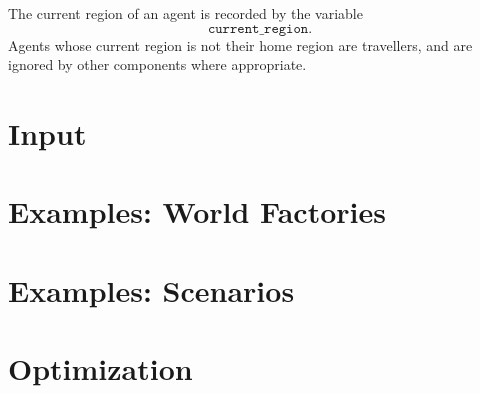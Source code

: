 \documentclass[10pt,letterpaper]{article}
\begin{document}
The current region of an agent is recorded by the variable $$\texttt{current{\_}region}.$$ Agents whose current region is not their home region are travellers, and are ignored by other components where appropriate.

\section{Input}

\section{Examples: World Factories}

\section{Examples: Scenarios}

\section{Optimization}

% 
\end{document}
